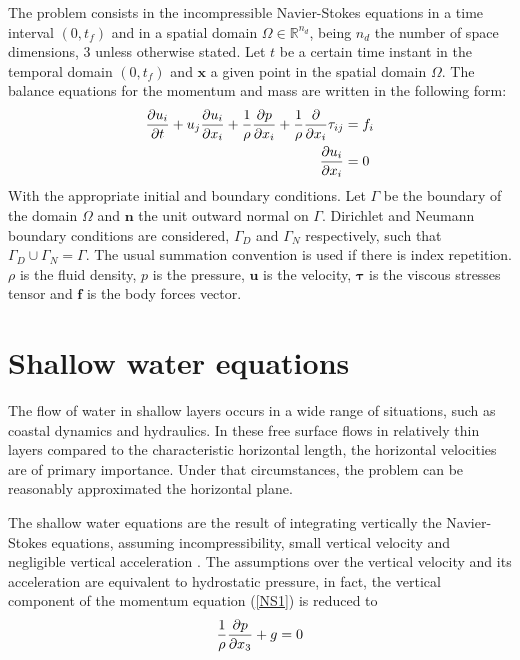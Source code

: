 The problem consists in the incompressible Navier-Stokes equations in a time interval $(0, t_f)$ and in a spatial domain $\Omega \in \mathbb{R}^{n_d}$, being $n_d$ the number of space dimensions, $3$ unless otherwise stated. Let $t$ be a certain time instant in the temporal domain $(0, t_f)$ and $\mathbf{x}$ a given point in the spatial domain $\Omega$. The balance equations for the momentum and mass are written in the following form:
\begin{subequations} \label{NS}
    \begin{align} \label{NS1}
        \frac{\partial u_i}{\partial t} + u_j \frac{\partial u_i}{\partial x_i} + \frac{1}{\rho} \frac{\partial p}{\partial x_i} +
            \frac{1}{\rho} \frac{\partial}{\partial x_i} \tau_{ij} &= f_i \\ \label{NS2}
        \frac{\partial u_i}{\partial x_i} &= 0
    \end{align}
\end{subequations}
With the appropriate initial and boundary conditions. Let $\Gamma$ be the boundary of the domain $\Omega$ and $\mathbf{n}$ the unit outward normal on $\Gamma$. Dirichlet and Neumann boundary conditions are considered, $\Gamma_D$ and $\Gamma_N$ respectively, such that $\Gamma_D \cup \Gamma_N = \Gamma$.
The usual summation convention is used if there is index repetition.
$\rho$ is the fluid density, $p$ is the pressure, $\mathbf{u}$ is the velocity, $\bm{\tau}$ is the viscous stresses tensor and $\mathbf{f}$ is the body forces vector.








\section{Shallow water equations}
\label{equations_sw}


The flow of water in shallow layers occurs in a wide range of situations, such as coastal dynamics and hydraulics. In these free surface flows in relatively thin layers compared to the characteristic horizontal length, the horizontal velocities are of primary importance. Under that circumstances, the problem can be reasonably approximated the horizontal plane.

The shallow water equations are the result of integrating vertically the Navier-Stokes equations, assuming incompressibility, small vertical velocity and negligible vertical acceleration \cite{abbott1979,zien3}. The assumptions over the vertical velocity and its acceleration are equivalent to hydrostatic pressure, in fact, the vertical component of the momentum equation (\ref{NS1}) is reduced to
\begin{equation} \label{SW_hydrostatic_pressure}
    \frac{1}{\rho}\frac{\partial p}{\partial x_3} + g = 0
\end{equation}

